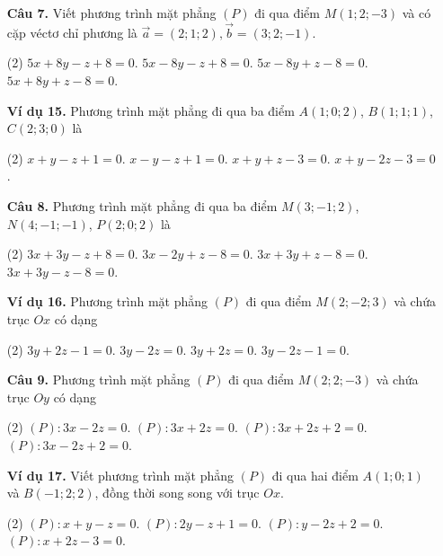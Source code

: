 \documentclass[12pt, a4paper]{article}
\renewcommand{\vec}[1]{\overrightarrow{#1}}
\begin{document}
\begin{enumerate}[label=\textbf{\arabic*.}, wide=0pt, leftmargin=*]
    \item[\textbf{Câu 7.}] Viết phương trình mặt phẳng \((P)\) đi qua điểm \(M(1;2;-3)\) và có cặp véctơ chỉ phương là \(\vec{a}=(2;1;2), \vec{b}=(3;2;-1)\).
    \begin{tasks}(2)
        \task \(5x + 8y - z + 8 = 0\).
        \task \(5x - 8y - z + 8 = 0\).
        \task \(5x - 8y + z - 8 = 0\).
        \task \(5x + 8y + z - 8 = 0\).
    \end{tasks}
    
    \item[\textbf{Ví dụ 15.}] Phương trình mặt phẳng đi qua ba điểm \(A(1;0;2)\), \(B(1;1;1)\), \(C(2;3;0)\) là
    \begin{tasks}(2)
        \task \(x+y-z+1=0\).
        \task \(x-y-z+1=0\).
        \task \(x+y+z-3=0\).
        \task \(x+y-2z-3=0\).
    \end{tasks}

    \item[\textbf{Câu 8.}] Phương trình mặt phẳng đi qua ba điểm \(M(3;-1;2)\), \(N(4;-1;-1)\), \(P(2;0;2)\) là
    \begin{tasks}(2)
        \task \(3x + 3y - z + 8 = 0\).
        \task \(3x - 2y + z - 8 = 0\).
        \task \(3x + 3y + z - 8 = 0\).
        \task \(3x + 3y - z - 8 = 0\).
    \end{tasks}
    
    
    \item[\textbf{Ví dụ 16.}] Phương trình mặt phẳng \((P)\) đi qua điểm \(M(2;-2;3)\) và chứa trục \(Ox\) có dạng
    \begin{tasks}(2)
        \task \(3y+2z-1=0\).
        \task \(3y-2z=0\).
        \task \(3y+2z=0\).
        \task \(3y-2z-1=0\).
    \end{tasks}
    
    \item[\textbf{Câu 9.}] Phương trình mặt phẳng \((P)\) đi qua điểm \(M(2;2;-3)\) và chứa trục \(Oy\) có dạng
    \begin{tasks}(2)
        \task \((P): 3x-2z=0\).
        \task \((P): 3x+2z=0\).
        \task \((P): 3x+2z+2=0\).
        \task \((P): 3x-2z+2=0\).
    \end{tasks}
    
    \item[\textbf{Ví dụ 17.}] Viết phương trình mặt phẳng \((P)\) đi qua hai điểm \(A(1;0;1)\) và \(B(-1;2;2)\), đồng thời song song với trục \(Ox\).
    \begin{tasks}(2)
        \task \((P): x+y-z=0\).
        \task \((P): 2y-z+1=0\).
        \task \((P): y-2z+2=0\).
        \task \((P): x+2z-3=0\).
    \end{tasks}
    

\end{enumerate}
\end{document}

